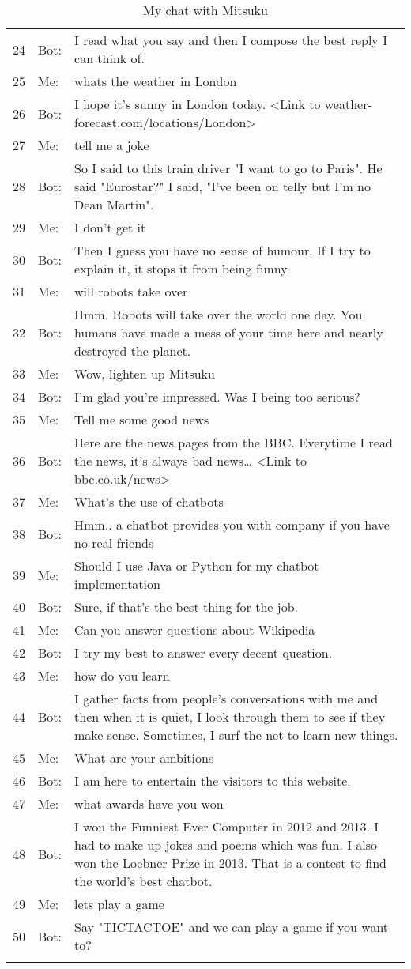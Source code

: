 \begin{longtable}{@{}p{} p{}  p{}@{}}
	24 & Bot: & I read what you say and then I compose the best reply I can think of. \\ 
	25 & Me: & whats the weather in London \\ 
	26 & Bot: & I hope it's sunny in London today. <Link to weather-forecast.com/locations/London> \\ 
	27 & Me: & tell me a joke \\ 
	28 & Bot: & So I said to this train driver "I want to go to Paris". He said "Eurostar?" I said, "I've been on telly but I'm no Dean Martin". \\ 
	29 & Me: & I don't get it \\ 
	30 & Bot: & Then I guess you have no sense of humour. If I try to explain it, it stops it from being funny. \\ 
	31 & Me: & will robots take over \\ 
	32 & Bot: & Hmm. Robots will take over the world one day. You humans have made a mess of your time here and nearly destroyed the planet. \\ 
	33 & Me: & Wow, lighten up Mitsuku \\ 
	34 & Bot: & I'm glad you're impressed. Was I being too serious? \\ 
	35 & Me: & Tell me some good news \\ 
	36 & Bot: & Here are the news pages from the BBC. Everytime I read the news, it's always bad news… <Link to bbc.co.uk/news> \\ 
	37 & Me: & What's the use of chatbots \\ 
	38 & Bot: & Hmm.. a chatbot provides you with company if you have no real friends \\ 
	39 & Me: & Should I use Java or Python for my chatbot implementation \\ 
	40 & Bot: & Sure, if that's the best thing for the job. \\ 
	41 & Me: & Can you answer questions about Wikipedia \\ 
	42 & Bot: & I try my best to answer every decent question. \\ 
	43 & Me: & how do you learn \\ 
	44 & Bot: & I gather facts from people's conversations with me and then when it is quiet, I look through them to see if they make sense. Sometimes, I surf the net to learn new things. \\ 
	45 & Me: & What are your ambitions \\ 
	46 & Bot: & I am here to entertain the visitors to this website. \\ 
	47 & Me: & what awards have you won \\ 
	48 & Bot: & I won the Funniest Ever Computer in 2012 and 2013. I had to make up jokes and poems which was fun. I also won the Loebner Prize in 2013. That is a contest to find the world's best chatbot. \\ 
	49 & Me: & lets play a game \\ 
	50 & Bot: & Say "TICTACTOE" and we can play a game if you want to? \\ 
	\bottomrule
	\caption{My chat with Mitsuku}
\end{longtable}

